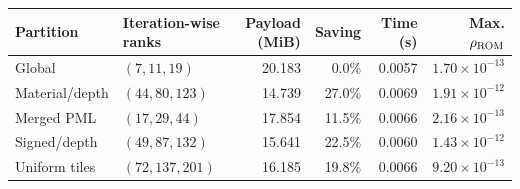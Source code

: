 \begin{tabular}{llrrrr}\toprule
Partition & Iteration-wise ranks & Payload (MiB) & Saving & Time (s) & Max. $\rho_{\rm ROM}$ \\
\midrule
Global & \((7,11,19)\) & 20.183 & 0.0\% & 0.0057 & \(1.70\times10^{-13}\) \\
Material/depth & \((44,80,123)\) & 14.739 & 27.0\% & 0.0069 & \(1.91\times10^{-12}\) \\
Merged PML & \((17,29,44)\) & 17.854 & 11.5\% & 0.0066 & \(2.16\times10^{-13}\) \\
Signed/depth & \((49,87,132)\) & 15.641 & 22.5\% & 0.0060 & \(1.43\times10^{-12}\) \\
Uniform tiles & \((72,137,201)\) & 16.185 & 19.8\% & 0.0066 & \(9.20\times10^{-13}\) \\
\bottomrule\end{tabular}
